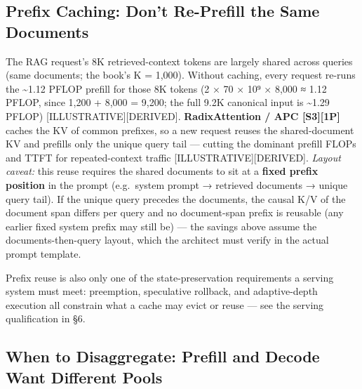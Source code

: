 \subsection{Prefix Caching: Don't Re-Prefill the Same
Documents}\label{prefix-caching-dont-re-prefill-the-same-documents}

The RAG request's 8K retrieved-context tokens are largely shared across
queries (same documents; the book's K = 1,000). Without caching, every
request re-runs the \textasciitilde1.12 PFLOP prefill for those 8K
tokens (2 × 70 × 10⁹ × 8,000 ≈ 1.12 PFLOP, since 1,200 + 8,000 = 9,200;
the full 9.2K canonical input is \textasciitilde1.29 PFLOP)
\mbox{{[}ILLUSTRATIVE{]}}\hspace{0pt}\mbox{{[}DERIVED{]}}. \textbf{RadixAttention / APC
\mbox{{[}S3{]}}\hspace{0pt}\mbox{{[}1P{]}}} caches the KV of common prefixes, so a new request
reuses the shared-document KV and prefills only the unique query tail
--- cutting the dominant prefill FLOPs and TTFT for repeated-context
traffic \mbox{{[}ILLUSTRATIVE{]}}\hspace{0pt}\mbox{{[}DERIVED{]}}. \emph{Layout caveat:} this
reuse requires the shared documents to sit at a \textbf{fixed prefix
position} in the prompt (e.g.~system prompt → retrieved documents →
unique query tail). If the unique query precedes the documents, the
causal K/V of the document span differs per query and no document-span
prefix is reusable (any earlier fixed system prefix may still be) ---
the savings above assume the documents-then-query layout, which the
architect must verify in the actual prompt template.

Prefix reuse is also only one of the state-preservation requirements a
serving system must meet: preemption, speculative rollback, and
adaptive-depth execution all constrain what a cache may evict or reuse
--- see the serving qualification in §6.

\subsection{When to Disaggregate: Prefill and Decode Want Different
Pools}\label{when-to-disaggregate-prefill-and-decode-want-different-pools}

